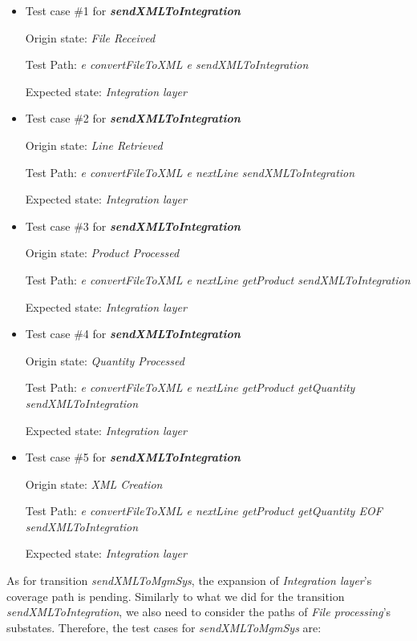 \begin{itemize}

\item Test case \#1 for \textit{\textbf{sendXMLToIntegration}}

Origin state: \textit{File Received}

Test Path: \textit{e convertFileToXML e sendXMLToIntegration}

Expected state: \textit{Integration layer}

\item Test case \#2 for \textit{\textbf{sendXMLToIntegration}}

Origin state: \textit{Line Retrieved}

Test Path: \textit{e convertFileToXML e  nextLine sendXMLToIntegration}

Expected state: \textit{Integration layer}


\item Test case \#3 for \textit{\textbf{sendXMLToIntegration}}

Origin state: \textit{Product Processed}

Test Path: \textit{e convertFileToXML e  nextLine  getProduct sendXMLToIntegration}

Expected state: \textit{Integration layer}

\item Test case \#4 for \textit{\textbf{sendXMLToIntegration}}

Origin state: \textit{Quantity Processed}

Test Path: \textit{e convertFileToXML e  nextLine  getProduct  getQuantity sendXMLToIntegration}

Expected state: \textit{Integration layer}

\item Test case \#5 for \textit{\textbf{sendXMLToIntegration}}

Origin state: \textit{XML Creation}

Test Path: \textit{e convertFileToXML e  nextLine  getProduct  getQuantity EOF sendXMLToIntegration}

Expected state: \textit{Integration layer}

\end{itemize}

As for transition \textit{sendXMLToMgmSys}, the expansion of \textit{Integration layer}'s coverage path is pending. Similarly to what we did for the transition \textit{sendXMLToIntegration}, we also need to consider the paths of \textit{File processing}'s substates. Therefore, the test cases for \textit{sendXMLToMgmSys} are:

